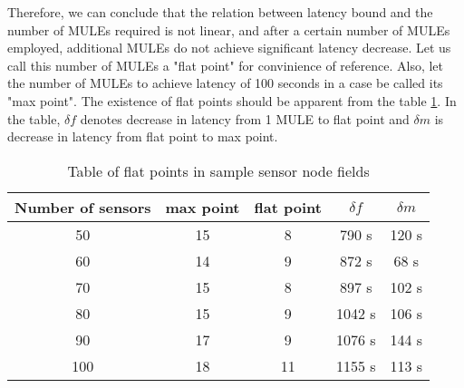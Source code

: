 Therefore, we can conclude that the relation between latency bound and the number of MULEs required is not linear, and after a certain number of MULEs employed, additional MULEs do not achieve significant latency decrease. Let us call this number of MULEs a "flat point" for convinience of reference. Also, let the number of MULEs to achieve latency of 100 seconds in a case be called its "max point". The existence of flat points should be apparent from the table \ref{table:flat}. In the table, $\delta f$ denotes decrease in latency from 1 MULE to flat point and $\delta m$ is decrease in latency from flat point to max point.

\begin{table}
\centering
\caption{Table of flat points in sample sensor node fields} \label{table:flat}
 \begin{tabular}{||c c c c c||}
 \hline
 Number of sensors & max point & flat point & $\delta f$ & $\delta m$ \\  
 \hline\hline
 50 & 15 & 8 & 790 s & 120 s\\ 
 \hline
 60 & 14 & 9 & 872 s & 68 s\\
 \hline
 70 & 15 & 8 & 897 s & 102 s\\
 \hline
 80 & 15 & 9 & 1042 s & 106 s\\
 \hline
 90 & 17 & 9 & 1076 s & 144 s\\
 \hline
 100 & 18 & 11 & 1155 s & 113 s\\
 \hline
\end{tabular}
\end{table}